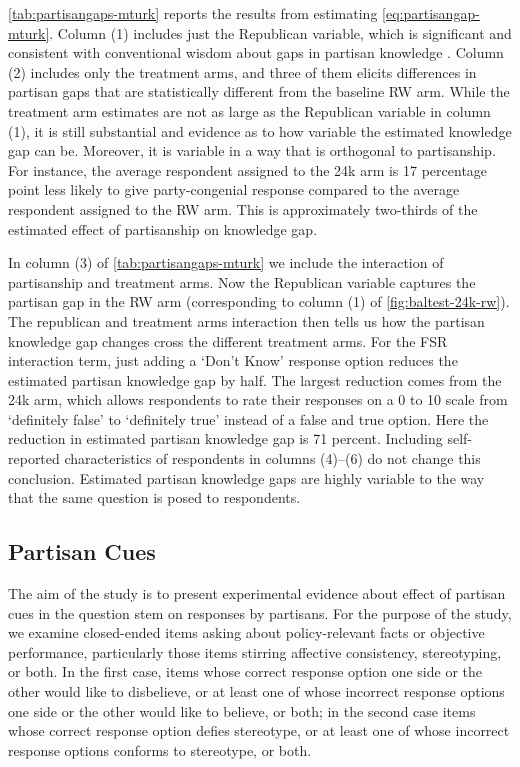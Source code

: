 \documentclass[12pt, letterpaper]{article}
\begin{document}
\cref{tab:partisangaps-mturk} reports the results from estimating \cref{eq:partisangap-mturk}. Column (1) includes just the Republican variable, which is significant and consistent with conventional wisdom about gaps in partisan knowledge \citep[e.g.][]{bullocketal_2015, pew2018disagree}. Column (2) includes only the treatment arms, and three of them elicits differences in partisan gaps that are statistically different from the baseline RW arm. While the treatment arm estimates are not as large as the Republican variable in column (1), it is still substantial and evidence as to how variable the estimated knowledge gap can be. Moreover, it is variable in a way that is orthogonal to partisanship. For instance, the average respondent assigned to the 24k arm is 17 percentage point less likely to give party-congenial response compared to the average respondent assigned to the RW arm. This is approximately two-thirds of the estimated effect of partisanship on knowledge gap.

In column (3) of \cref{tab:partisangaps-mturk} we include the interaction of partisanship and treatment arms. Now the Republican variable captures the partisan gap in the RW arm (corresponding to column (1) of \cref{fig:baltest-24k-rw}). The republican and treatment arms interaction then tells us how the partisan knowledge gap changes cross the different treatment arms. 
For the FSR interaction term, just adding a `Don't Know' response option reduces the estimated partisan knowledge gap by half.
The largest reduction comes from the 24k arm, which allows respondents to rate their responses on a 0 to 10 scale from `definitely false' to `definitely true' instead of a false and true option. Here the reduction in estimated partisan knowledge gap is 71 percent. Including self-reported characteristics of respondents in columns (4)--(6) do not change this conclusion. Estimated partisan knowledge gaps are highly variable to the way that the same question is posed to respondents.






\subsection{Partisan Cues}
The aim of the study is to present experimental evidence about effect of partisan cues in the question stem on responses by partisans. For the purpose of the study, we examine closed-ended items asking about policy-relevant facts or objective performance, particularly those items stirring affective consistency, stereotyping, or both.  In the first case, items whose correct response option one side or the other would like to disbelieve, or at least one of whose incorrect response options one side or the other would like to believe, or both; in the second case items whose correct response option defies stereotype, or at least one of whose incorrect response options conforms to stereotype, or both.  
\end{document}
